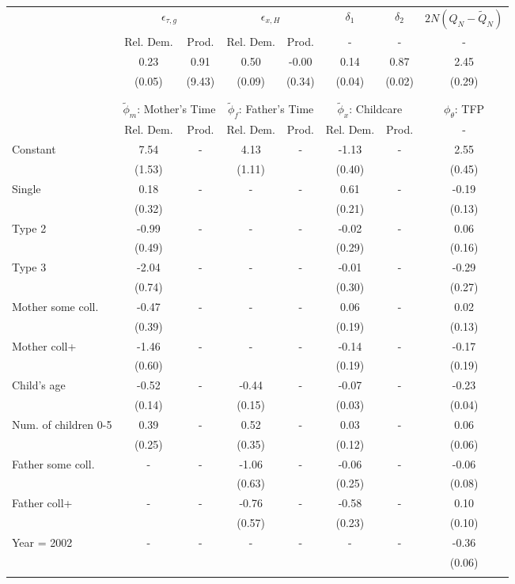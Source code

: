 \begin{tabular}{lccccccc}\toprule
 & \multicolumn{2}{c}{$\epsilon_{\tau,g}$} & \multicolumn{2}{c}{$\epsilon_{x,H}$} & {$\delta_{1}$} & {$\delta_{2}$} & $2N(Q_{N} - \tilde{Q}_{N})$ \\
 & Rel. Dem. & Prod. & Rel. Dem. & Prod. & - & - & - \\\cmidrule(r){2-3}\cmidrule(r){4-5}\cmidrule(r){6-6}\cmidrule(r){7-7}\cmidrule(r){8-8}
&0.23&0.91&0.50&-0.00&0.14&0.87&2.45\\
&(0.05)&(9.43)&(0.09)&(0.34)&(0.04)&(0.02)&(0.29)\\
\\
&&&&&&&\\
 & \multicolumn{2}{c}{$\tilde{\phi}_{m}$: Mother's Time} & \multicolumn{2}{c}{$\tilde{\phi}_{f}$: Father's Time} & \multicolumn{2}{c}{$\tilde{\phi}_{x}$: Childcare} &{$\phi_{\theta}$: TFP} \\
 & Rel. Dem. & Prod. & Rel. Dem. & Prod. & Rel. Dem. & Prod. & -  \\\cmidrule(r){2-3}\cmidrule(r){4-5}\cmidrule(r){6-7}\cmidrule(r){8-8}
Constant&7.54& -&4.13& -&-1.13& -&2.55\\
&(1.53)&&(1.11)&&(0.40)&&(0.45)\\
Single&0.18& -& - & -&0.61& -&-0.19\\
&(0.32)& & &&(0.21)&&(0.13)\\
Type 2&-0.99& -& - & -&-0.02& -&0.06\\
&(0.49)& & &&(0.29)&&(0.16)\\
Type 3&-2.04& -& - & -&-0.01& -&-0.29\\
&(0.74)& & &&(0.30)&&(0.27)\\
Mother some coll.&-0.47& -& - & -&0.06& -&0.02\\
&(0.39)& & &&(0.19)&&(0.13)\\
Mother coll+&-1.46& -& - & -&-0.14& -&-0.17\\
&(0.60)& & &&(0.19)&&(0.19)\\
Child's age&-0.52& -&-0.44& -&-0.07& -&-0.23\\
&(0.14)&&(0.15)&&(0.03)&&(0.04)\\
Num. of children 0-5&0.39& -&0.52& -&0.03& -&0.06\\
&(0.25)&&(0.35)&&(0.12)&&(0.06)\\
Father some coll.& - & -&-1.06& -&-0.06& -&-0.06\\
 & &&(0.63)&&(0.25)&&(0.08)\\
Father coll+& - & -&-0.76& -&-0.58& -&0.10\\
 & &&(0.57)&&(0.23)&&(0.10)\\
Year = 2002& - & -& - & -& - & -&-0.36\\
 & & & & & &&(0.06)\\
\\
\bottomrule\end{tabular}